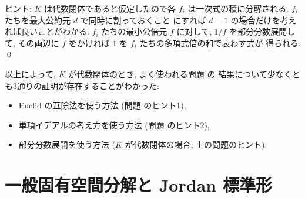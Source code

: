 \documentclass[12pt,twoside]{jarticle}
\begin{document}
\noindent
ヒント: $K$ は代数閉体であると仮定したので各 $f_i$ は一次式の積に分解される.
$f_i$ たちを最大公約元 $d$ で同時に割っておくこと
にすれば $d=1$ の場合だけを考えれば良いことがわかる.
$f_i$ たちの最小公倍元 $f$ に対して, $1/f$ を部分分数展開して, 
その両辺に $f$ をかければ $1$ を $f_i$ たちの多項式倍の和で表わす式が
得られる.
\qed

\bigskip

以上によって, $K$ が代数閉体のとき, 
よく使われる問題  の
結果について少なくとも3通りの証明が存在することがわかった:
\begin{itemize}
\item Euclid の互除法を使う方法
  (問題  のヒント1),
\item 単項イデアルの考え方を使う方法
  (問題  のヒント2),
\item 部分分数展開を使う方法
  ($K$ が代数閉体の場合, 上の問題のヒント).
\end{itemize}


\section{一般固有空間分解と Jordan 標準形}
\label{sec:Jordan-nilpotent}
\end{document}
